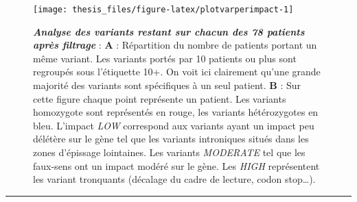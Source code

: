 \documentclass[12pt,a4paper,twoside]{ugathesis}
\theoremstyle{definition}
\theoremstyle{definition}
\theoremstyle{definition}
\theoremstyle{remark}
\begin{document}
\begin{figure}

{\centering \texttt{[image: thesis\_files/figure-latex/plotvarperimpact-1]} 

}

\caption[Analyse des variants restant sur chacun des 78 patients après filtrage]{\textbf{\emph{Analyse des variants restant sur
chacun des 78 patients après filtrage}} : \textbf{A} : Répartition du
nombre de patients portant un même variant. Les variants portés par 10
patients ou plus sont regroupés sous l'étiquette 10+. On voit ici
clairement qu'une grande majorité des variants sont spécifiques à un
seul patient. \textbf{B} : Sur cette figure chaque point représente un
patient. Les variants homozygote sont représentés en rouge, les variants
hétérozygotes en bleu. L'impact \emph{LOW} correspond aux variants ayant
un impact peu délétère sur le gène tel que les variants introniques
situés dans les zones d'épissage lointaines. Les variants
\emph{MODERATE} tel que les faux-sens ont un impact modéré sur le gène.
Les \emph{HIGH} représentent les variant tronquants (décalage du cadre
de lecture, codon stop\ldots{}).}\label{fig:plotvarperimpact}
\end{figure}















\newpage

\begin{center}\rule{0.5\linewidth}{\linethickness}\end{center}
\end{document}

